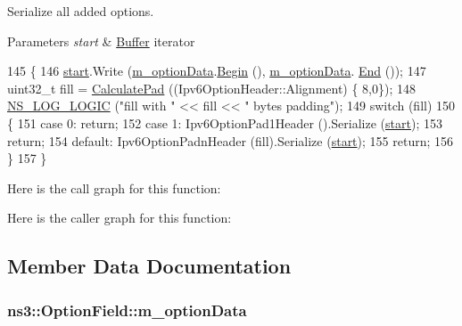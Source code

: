 Serialize all added options. 


\begin{DoxyParams}{Parameters}
{\em start} & \hyperlink{classns3_1_1Buffer}{Buffer} iterator \\
\hline
\end{DoxyParams}

\begin{DoxyCode}
145 \{
146   \hyperlink{namespacevisualizer_1_1core_a2a35e5d8a34af358b508dac8635754e0}{start}.Write (\hyperlink{classns3_1_1OptionField_a915db445f931653af7165be5cc9d8ba5}{m\_optionData}.\hyperlink{classns3_1_1Buffer_a893d4bf50df13e730b6cd0fda91b967f}{Begin} (), \hyperlink{classns3_1_1OptionField_a915db445f931653af7165be5cc9d8ba5}{m\_optionData}.
      \hyperlink{classns3_1_1Buffer_a52207c7aed7bae89fba2f9e997c82724}{End} ());
147   uint32\_t fill = \hyperlink{classns3_1_1OptionField_ac3fd1a6232d5a5885feccda8b6f70a31}{CalculatePad} ((Ipv6OptionHeader::Alignment) \{ 8,0\});
148   \hyperlink{group__logging_ga88acd260151caf2db9c0fc84997f45ce}{NS\_LOG\_LOGIC} (\textcolor{stringliteral}{"fill with "} << fill << \textcolor{stringliteral}{" bytes padding"});
149   \textcolor{keywordflow}{switch} (fill)
150     \{
151     \textcolor{keywordflow}{case} 0: \textcolor{keywordflow}{return};
152     \textcolor{keywordflow}{case} 1: Ipv6OptionPad1Header ().Serialize (\hyperlink{namespacevisualizer_1_1core_a2a35e5d8a34af358b508dac8635754e0}{start});
153       \textcolor{keywordflow}{return};
154     \textcolor{keywordflow}{default}: Ipv6OptionPadnHeader (fill).Serialize (\hyperlink{namespacevisualizer_1_1core_a2a35e5d8a34af358b508dac8635754e0}{start});
155       \textcolor{keywordflow}{return};
156     \}
157 \}
\end{DoxyCode}


Here is the call graph for this function\+:




Here is the caller graph for this function\+:




\subsection{Member Data Documentation}
\subsubsection[{\texorpdfstring{m\+\_\+option\+Data}{m_optionData}}]{ ns3\+::\+Option\+Field\+::m\+\_\+option\+Data\hspace{0.3cm}{\ttfamily [private]}}\hypertarget{classns3_1_1OptionField_a915db445f931653af7165be5cc9d8ba5}{}\label{classns3_1_1OptionField_a915db445f931653af7165be5cc9d8ba5}



